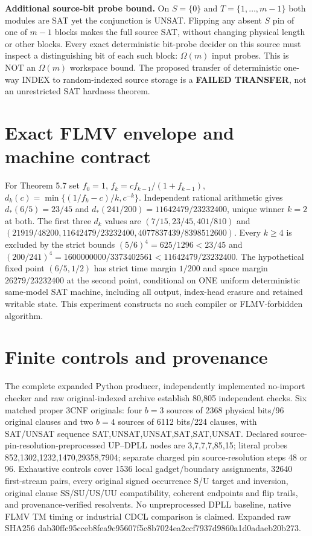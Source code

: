 \documentclass[11pt]{article}
\begin{document}
\noindent\textbf{Additional source-bit probe bound.} On $S=\{0\}$ and $T=\{1,\ldots,m-1\}$ both modules are SAT yet the conjunction is UNSAT. Flipping any absent $S$ pin of one of $m-1$ blocks makes the full source SAT, without changing physical length or other blocks. Every exact deterministic bit-probe decider on this source must inspect a distinguishing bit of each such block: $\Omega(m)$ input probes. This is NOT an $\Omega(m)$ workspace bound. The proposed transfer of deterministic one-way INDEX to random-indexed source storage is a \textbf{FAILED TRANSFER}, not an unrestricted SAT hardness theorem.
\section{Exact FLMV envelope and machine contract}
For Theorem 5.7 set $f_0=1$, $f_k=cf_{k-1}/(1+f_{k-1})$, $d_k(c)=\min\{(1/f_k-c)/k,c^{-k}\}$. Independent rational arithmetic gives $d_*(6/5)=23/45$ and $d_*(241/200)=11642479/23232400$, unique winner $k=2$ at both. The first three $d_k$ values are $(7/15,23/45,401/810)$ and $(21919/48200,11642479/23232400,4077837439/8398512600)$. Every $k\ge4$ is excluded by the strict bounds $(5/6)^4=625/1296<23/45$ and $(200/241)^4=1600000000/3373402561<11642479/23232400$. The hypothetical fixed point $(6/5,1/2)$ has strict time margin $1/200$ and space margin $26279/23232400$ at the second point, conditional on ONE uniform deterministic same-model SAT machine, including all output, index-head erasure and retained writable state. This experiment constructs no such compiler or FLMV-forbidden algorithm.
\section{Finite controls and provenance}
The complete expanded Python producer, independently implemented no-import checker and raw original-indexed archive establish 80,805 independent checks. Six matched proper 3CNF originals: four $b=3$ sources of 2368 physical bits/96 original clauses and two $b=4$ sources of 6112 bits/224 clauses, with SAT/UNSAT sequence SAT,UNSAT,UNSAT,SAT,SAT,UNSAT. Declared source-pin-resolution-preprocessed UP--DPLL nodes are 3,7,7,7,85,15; literal probes 852,1302,1232,1470,29358,7904; separate charged pin source-resolution steps 48 or 96. Exhaustive controls cover 1536 local gadget/boundary assignments, 32640 first-stream pairs, every original signed occurrence S/U target and inversion, original clause SS/SU/US/UU compatibility, coherent endpoints and flip trails, and provenance-verified resolvents. No unpreprocessed DPLL baseline, native FLMV TM timing or industrial CDCL comparison is claimed. Expanded raw SHA256 dab30ffc95cceb8fea9c95607f5c8b7024ea2ccf7937d9860a1d0adaeb20b273.
\end{document}
